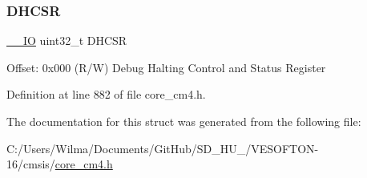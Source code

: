 \subsubsection{\texorpdfstring{D\+H\+C\+SR}{DHCSR}}
{\footnotesize\ttfamily \hyperlink{group___c_m_s_i_s__core__definitions_gaec43007d9998a0a0e01faede4133d6be}{\+\_\+\+\_\+\+IO} uint32\+\_\+t D\+H\+C\+SR}

Offset\+: 0x000 (R/W) Debug Halting Control and Status Register 

Definition at line 882 of file core\+\_\+cm4.\+h.



The documentation for this struct was generated from the following file\+:\begin{DoxyCompactItemize}
\item 
C\+:/\+Users/\+Wilma/\+Documents/\+Git\+Hub/\+S\+D\+\_\+\+H\+U\+\_/\+V\+E\+S\+O\+F\+T\+O\+N-\/16/cmsis/\hyperlink{core__cm4_8h}{core\+\_\+cm4.\+h}\end{DoxyCompactItemize}
